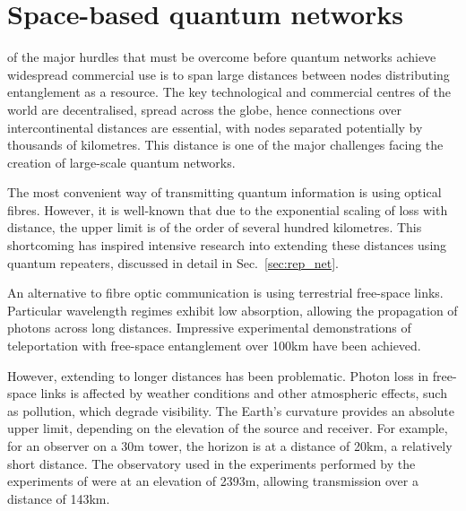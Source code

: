 %
%

\section{Space-based quantum networks}\label{sec:quant_space_race}

 of the major hurdles that must be overcome before quantum networks achieve widespread commercial use is to span large distances between nodes distributing entanglement as a resource. The key technological and commercial centres of the world are decentralised, spread across the globe, hence connections over intercontinental distances are essential, with nodes separated potentially by thousands of kilometres. This distance is one of the major challenges facing the creation of large-scale quantum networks.

The most convenient way of transmitting quantum information is using optical fibres. However, it is well-known that due to the exponential scaling of loss with distance, the upper limit is of the order of several hundred kilometres. This shortcoming has inspired intensive research into extending these distances using quantum repeaters, discussed in detail in Sec.~\ref{sec:rep_net}.

An alternative to fibre optic communication is using terrestrial free-space links. Particular wavelength regimes exhibit low absorption, allowing the propagation of photons across long distances. Impressive experimental demonstrations of teleportation with free-space entanglement \cite{bib:NP_3_481, bib:Nat_489_269, bib:yin2013lower} over 100km have been achieved.

However, extending to longer distances has been problematic. Photon loss in free-space links is affected by weather conditions and other atmospheric effects, such as pollution, which degrade visibility. The Earth's curvature provides an absolute upper limit, depending on the elevation of the source and receiver. For example, for an observer on a 30m tower, the horizon is at a distance of 20km, a relatively short distance. The observatory used in the experiments performed by the experiments of \cite{bib:NP_3_481, bib:Nat_489_269} were at an elevation of 2393m, allowing transmission over a distance of 143km.

